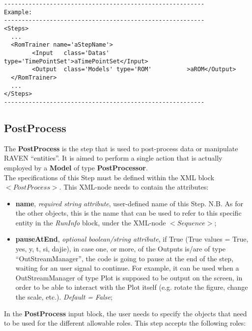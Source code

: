 \begin{lstlisting}[style=XML]
---------------------------------------------------------
Example:
---------------------------------------------------------
<Steps>
  ...
  <RomTrainer name='aStepName'>
        <Input   class='Datas'  type='TimePointSet'>aTimePointSet</Input>
        <Output  class='Models' type='ROM'          >aROM</Output>
  </RomTrainer>
  ...
</Steps>
---------------------------------------------------------
\end{lstlisting}
\subsection{PostProcess}
\label{subsec:stepPostProcess}
The \textbf{PostProcess} is the step that is used to post-process data or manipulate RAVEN ``entities''. It is aimed to perform a single action that is actually employed by a \textbf{Model} of type \textbf{PostProcessor}.
\\ The specifications of this Step must be defined within the XML block $<PostProcess>$. This XML-node needs to contain the attributes:
\vspace{-5mm}
\begin{itemize}
\itemsep0em
\item \textbf{name}, \textit{required string attribute}, user-defined name of this Step. N.B. As for the other objects, this is the name that can be used to refer to this specific entity in the \textit{RunInfo} block, under the XML-node $<Sequence>$;
\item \textbf{pauseAtEnd}, \textit{optional boolean/string attribute}, if True (True values = True, yes, y, t, si, dajie), in case one, or more, of the Outputs is/are of type ``OutStreamManager'', the code is going to pause at the end of the step, waiting for an user signal to continue. For example, it can be used when a OutStreamManager of type Plot is supposed to be output on the screen, in order to be able to interact with the Plot itself (e.g. rotate the figure, change the scale, etc.).  \textit{Default = False};
\end{itemize}
\vspace{-5mm}
In the \textbf{PostProcess} input block, the user needs to specify the objects that need to be used for the different allowable roles. This step accepts the following roles:
